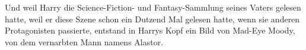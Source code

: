 Und weil Harry die Science-Fiction- und Fantasy-Sammlung seines Vaters gelesen hatte, weil er diese Szene schon ein Dutzend Mal gelesen hatte, wenn sie anderen Protagonisten passierte, entstand in Harrys Kopf ein Bild von Mad-Eye Moody, von dem vernarbten Mann namens Alastor.
